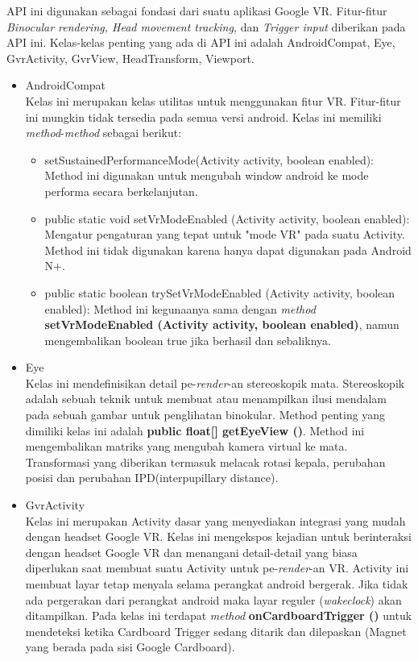 API ini digunakan sebagai fondasi dari suatu aplikasi Google VR.\cite{google_vr_developers} Fitur-fitur \textit{Binocular rendering, Head movement tracking,} dan \textit{Trigger input} diberikan pada API ini. Kelas-kelas penting yang ada di API ini adalah AndroidCompat, Eye, GvrActivity, GvrView, HeadTransform, Viewport.
\begin{itemize}
	\item AndroidCompat\\
Kelas ini merupakan kelas utilitas untuk menggunakan fitur VR. Fitur-fitur ini mungkin tidak tersedia pada semua versi android. Kelas ini memiliki \textit{method}-\textit{method} sebagai berikut:
\begin{itemize}
	\item setSustainedPerformanceMode(Activity activity, boolean enabled): \\
	Method ini digunakan untuk mengubah window android ke mode performa secara berkelanjutan.
	\item public static void setVrModeEnabled (Activity activity, boolean enabled): \\
	Mengatur pengaturan yang tepat untuk "mode VR" pada suatu Activity. Method ini tidak digunakan karena hanya dapat digunakan pada Android N+.
	\item public static boolean trySetVrModeEnabled (Activity activity, boolean enabled): 
	Method ini kegunaanya sama dengan \textit{method} \textbf{setVrModeEnabled (Activity activity, boolean enabled)}, namun mengembalikan boolean true jika berhasil dan sebaliknya.
\end{itemize}
	\item Eye\\
Kelas ini mendefinisikan detail pe-\textit{render}-an stereoskopik mata. Stereoskopik adalah sebuah teknik untuk membuat atau menampilkan ilusi mendalam pada sebuah gambar untuk penglihatan binokular. Method penting yang dimiliki kelas ini adalah \textbf{public float[] getEyeView ()}. Method ini mengembalikan matriks yang mengubah kamera virtual ke mata. Transformasi yang diberikan termasuk melacak rotasi kepala, perubahan posisi dan perubahan IPD(interpupillary distance).
	\item GvrActivity\\
Kelas ini merupakan Activity dasar yang menyediakan integrasi yang mudah dengan headset Google VR. Kelas ini mengekspos kejadian untuk berinteraksi dengan headset Google VR dan menangani detail-detail yang biasa diperlukan saat membuat suatu Activity untuk pe-\textit{render}-an VR. Activity ini membuat layar tetap menyala selama perangkat android bergerak. Jika tidak ada pergerakan dari perangkat android maka layar reguler (\textit{wakeclock}) akan ditampilkan. Pada kelas ini terdapat \textit{method} \textbf{onCardboardTrigger ()} untuk mendeteksi ketika Cardboard Trigger sedang ditarik dan dilepaskan (Magnet yang berada pada sisi Google Cardboard).

\end{itemize}
